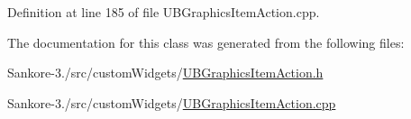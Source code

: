 Definition at line 185 of file U\-B\-Graphics\-Item\-Action.\-cpp.



The documentation for this class was generated from the following files\-:\begin{DoxyCompactItemize}
\item 
Sankore-\/3./src/custom\-Widgets/\hyperlink{_u_b_graphics_item_action_8h}{U\-B\-Graphics\-Item\-Action.\-h}\item 
Sankore-\/3./src/custom\-Widgets/\hyperlink{_u_b_graphics_item_action_8cpp}{U\-B\-Graphics\-Item\-Action.\-cpp}\end{DoxyCompactItemize}
